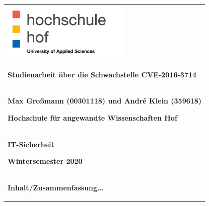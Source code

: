 \begin{center}
	\begin{tabular}{p{\textwidth}}

		\includegraphics[scale=0.75]{img/Logo.jpg}\\
		
		\begin{center}
			\textbf{Studienarbeit über die Schwachstelle CVE-2016-3714}
		\end{center}
		
		\\

		\begin{center}
			\textbf{Max Großmann (00301118) und André Klein (359618)}
		\end{center}
		\begin{center}
			\textbf{Hochschule für angewandte Wissenschaften Hof}
		\end{center}

		\\

		\begin{center}
			\textbf{IT-Sicherheit}
		\end{center}
		\begin{center}
			\textbf{Wintersemester 2020}
		\end{center}

		\\

		\begin{center}
			\textbf{Inhalt/Zusammenfassung...}
		\end{center}

	\end{tabular}
\end{center}
